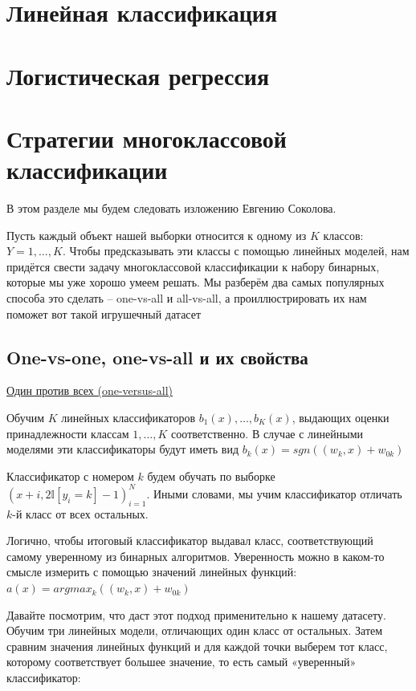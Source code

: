\documentclass[a4paper, 14pt]{article}
\begin{document}
    \section{Линейная классификация}
    
    
    \section{Логистическая регрессия}
    
    
    \section{Стратегии многоклассовой классификации}
    
    В этом разделе мы будем следовать изложению Евгению Соколова.
    
    Пусть каждый объект нашей выборки относится к одному из
    $K$ классов: $Y={1,\dots,K}$.
    Чтобы предсказывать эти классы с помощью линейных моделей, нам придётся свести задачу многоклассовой классификации к
    набору бинарных, которые мы уже хорошо умеем решать.
    Мы разберём два самых популярных способа это сделать – one-vs-all и all-vs-all, а проиллюстрировать их нам поможет
    вот такой игрушечный датасет
    
    \subsection{One-vs-one, one-vs-all и их свойства}
    
    \underline{Один против всех (one-versus-all)}
    
    Обучим $K$ линейных классификаторов $b_1(x), \dots, b_K(x)$, выдающих оценки принадлежности классам $1,\dots,K$
    соответственно.
    В случае с линейными моделями эти классификаторы будут иметь вид $b_k(x) = sgn((w_k, x) + w_{0k})$
    
    Классификатор с номером $k$ будем обучать по выборке $(x+i,2 \mathbb{I}[y_i=k]-1)_{i=1}^N$.
    Иными словами, мы учим классификатор отличать $k$-й класс от всех остальных.
    
    Логично, чтобы итоговый классификатор выдавал класс, соответствующий самому уверенному из бинарных алгоритмов.
    Уверенность можно в каком-то смысле измерить с помощью значений линейных функций: $a(x) = argmax_k ((w_k, x) + w_{0k})$
    
    Давайте посмотрим, что даст этот подход применительно к нашему датасету.
    Обучим три линейных модели, отличающих один класс от остальных.
    Затем сравним значения линейных функций и для каждой точки выберем тот класс, которому соответствует большее
    значение, то есть самый «уверенный» классификатор:
    
\end{document}

